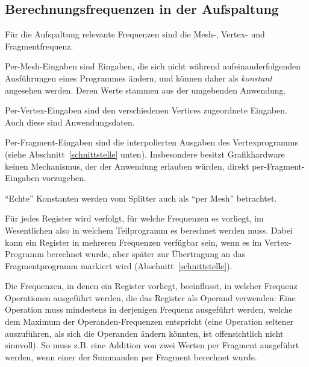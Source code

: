 \documentclass[twoside,a4paper,fleqn,12pt]{book}
\begin{document}
\subsection{Berechnungsfrequenzen in der Aufspaltung}
\label{splitter_Berechnungsfrequenzen}

Für die Aufspaltung relevante Frequenzen sind die Mesh-, %
Vertex- und Fragmentfrequenz.

Per-Mesh-Eingaben sind Eingaben, die sich nicht während aufeinanderfolgenden Ausführungen eines Programmes
ändern, und können daher als \emph{konstant} angesehen werden. Deren Werte stammen aus der umgebenden Anwendung.

Per-Vertex-Eingaben sind den verschiedenen Vertices zugeordnete Eingaben. %
Auch diese sind Anwendungsdaten.

Per-Fragment-Eingaben sind die interpolierten Ausgaben des Vertexprogramms (siehe Abschnitt~\ref{schnittstelle} unten). 
Insbesondere besitzt Grafikhardware keinen Mechanismus, der der Anwendung erlauben würden, direkt per-Fragment-Eingaben
vorzugeben.

"`Echte"' Konstanten werden vom Splitter auch als "`per Mesh"' betrachtet.

Für jedes Register wird verfolgt, für welche Frequenzen es vorliegt, im Wesentlichen also in welchem Teilprogramm es berechnet werden muss.
Dabei kann ein Register in mehreren Frequenzen verfügbar sein, wenn es im Vertex-Programm berechnet wurde, aber später 
zur Übertragung an das Fragmentprogramm markiert wird (Abschnitt~\ref{schnittstelle}).


Die Frequenzen, in denen ein Register vorliegt, beeinflusst, in welcher Frequenz Operationen ausgeführt werden,
die das Register als Operand verwenden: Eine Operation muss mindestens in derjenigen Frequenz ausgeführt werden, welche dem Maximum der Operanden-Frequenzen
entspricht (eine Operation seltener auszuführen, als sich die Operanden ändern könnten, ist offensichtlich nicht sinnvoll).
So muss z.B. eine Addition von zwei Werten per Fragment ausgeführt werden, wenn einer der Summanden per Fragment berechnet wurde.
\end{document}
